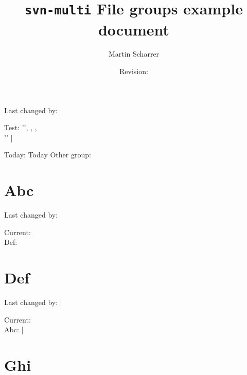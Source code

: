 \documentclass[a4paper,oneside]{scrbook}
\title{\texttt{svn-multi} File groups example document}
\author{Martin Scharrer}
\date{Revision: \svnrev}
\begin{document}
\maketitle
\tableofcontents
Last changed by: \svncfgauthor\relax

Test: '\svncfgrev{}', \svncfgauthor{}, \svncfgdate{}, \svncfgtimezone{}\\
'\svncfgday{}' | \svncfgday

Today: \svncfgtoday\relax
Today Other group: {\svncfgtoday}

\part{Abc}
Last changed by: \svncfgauthor{}




Current: \svncfgrev{}\\
Def: \\

\part{Def}
Last changed by: \svncfgauthor{} | \svnFullAuthor{\svncfgauthor}


Current: \svncfgrev{}\\
Abc:  | \svnFullAuthor{\svncfgauthor} \\

\part{Ghi}


\end{document}
